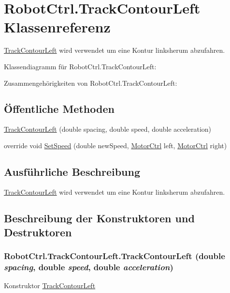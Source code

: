 \hypertarget{class_robot_ctrl_1_1_track_contour_left}{
\section{RobotCtrl.TrackContourLeft Klassenreferenz}
\label{class_robot_ctrl_1_1_track_contour_left}
}


\hyperlink{class_robot_ctrl_1_1_track_contour_left}{TrackContourLeft} wird verwendet um eine Kontur linksherum abzufahren.  




Klassendiagramm für RobotCtrl.TrackContourLeft:

Zusammengehörigkeiten von RobotCtrl.TrackContourLeft:\subsection*{Öffentliche Methoden}
\begin{DoxyCompactItemize}
\item 
\hyperlink{class_robot_ctrl_1_1_track_contour_left_a73c01532abc01420c2a35bea80be194d}{TrackContourLeft} (double spacing, double speed, double acceleration)
\item 
override void \hyperlink{class_robot_ctrl_1_1_track_contour_left_ae7938250af614625cd08a498c0f15195}{SetSpeed} (double newSpeed, \hyperlink{class_robot_ctrl_1_1_motor_ctrl}{MotorCtrl} left, \hyperlink{class_robot_ctrl_1_1_motor_ctrl}{MotorCtrl} right)
\end{DoxyCompactItemize}


\subsection{Ausführliche Beschreibung}
\hyperlink{class_robot_ctrl_1_1_track_contour_left}{TrackContourLeft} wird verwendet um eine Kontur linksherum abzufahren. 

\subsection{Beschreibung der Konstruktoren und Destruktoren}
\hypertarget{class_robot_ctrl_1_1_track_contour_left_a73c01532abc01420c2a35bea80be194d}{
\subsubsection[{TrackContourLeft}]{\setlength{\rightskip}{0pt plus 5cm}RobotCtrl.TrackContourLeft.TrackContourLeft (double {\em spacing}, \/  double {\em speed}, \/  double {\em acceleration})}}
\label{class_robot_ctrl_1_1_track_contour_left_a73c01532abc01420c2a35bea80be194d}
Konstruktor \hyperlink{class_robot_ctrl_1_1_track_contour_left}{TrackContourLeft}

